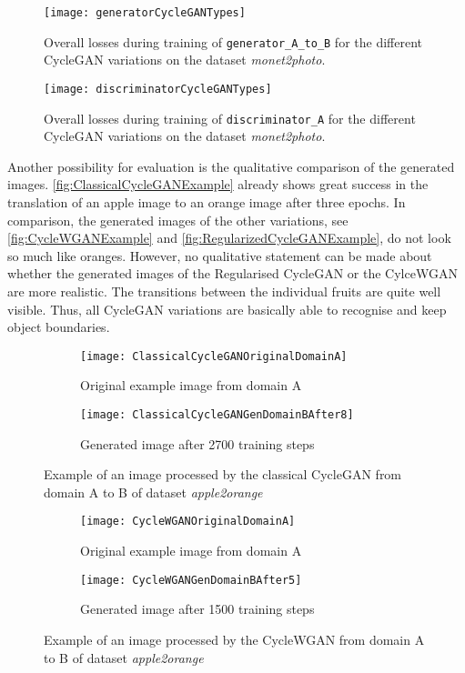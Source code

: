 \documentclass[fleqn,10pt]{SelfArx} %
\begin{document}
\begin{figure}[htb] 
	\centering 
	\texttt{[image: generatorCycleGANTypes]}
	\caption{Overall losses during training of \texttt{generator\_A\_to\_B} for the different Cycle\ac{GAN} variations on the dataset \textit{monet2photo}.}
	\label{fig:generatorCycleGANTypes}
\end{figure}

\begin{figure}[htb] 
	\centering 
	\texttt{[image: discriminatorCycleGANTypes]}
	\caption{Overall losses during training of \texttt{discriminator\_A} for the different Cycle\ac{GAN} variations on the dataset \textit{monet2photo}.}
	\label{fig:discriminatorCycleGANTypes}
\end{figure}

Another possibility for evaluation is the qualitative comparison of the generated images. \autoref{fig:ClassicalCycleGANExample} already  shows great success in the translation of an apple image to an orange image after three epochs. In comparison, the generated images of the other variations, see \autoref{fig:CycleWGANExample} and \autoref{fig:RegularizedCycleGANExample}, do not look so much like oranges. However, no qualitative statement can be made about whether the generated images of the Regularised Cycle\ac{GAN} or the Cylce{WGAN} are more realistic.
The transitions between the individual fruits are quite well visible. Thus, all Cycle\ac{GAN} variations are basically able to recognise and keep object boundaries.

\begin{figure}[htb] 
	\centering 
\begin{subfigure}[b]{0.45\linewidth}
	\texttt{[image: ClassicalCycleGANOriginalDomainA]}
	\caption{Original example image from domain A}
\end{subfigure}
\hfill
\begin{subfigure}[b]{0.45\linewidth}
	\texttt{[image: ClassicalCycleGANGenDomainBAfter8]}
	\caption{Generated image after 2700 training steps}
	\end{subfigure}
\caption{Example of an image processed by the classical Cycle\ac{GAN} from domain A to B of dataset \textit{apple2orange}}
\label{fig:ClassicalCycleGANExample}
\end{figure}

\begin{figure}[htb] 
	\centering 
\begin{subfigure}[b]{0.45\linewidth}
	\texttt{[image: CycleWGANOriginalDomainA]}
	\caption{Original example image from domain A}
\end{subfigure}
\hfill
\begin{subfigure}[b]{0.45\linewidth}
	\texttt{[image: CycleWGANGenDomainBAfter5]}
	\caption{Generated image after 1500 training steps}
	\end{subfigure}
\caption{Example of an image processed by the Cycle\ac{WGAN} from domain A to B of dataset \textit{apple2orange}}
\label{fig:CycleWGANExample}
\end{figure}
\end{document}
